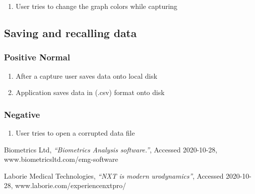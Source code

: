 \documentclass[12pt,a4paper]{article}
\begin{document}
\begin{enumerate}
	\item User tries to change the graph colors while capturing
\end{enumerate}

\subsection{Saving and recalling data}

\subsubsection{Positive Normal}

\begin{enumerate}
	\item After a capture user saves data onto local disk
	\item Application saves data in (.csv) format onto disk
\end{enumerate}

\subsubsection{Negative}

\begin{enumerate}
	\item User tries to open a corrupted data file  
\end{enumerate}

\newpage
\begin{thebibliography}{9}

  Biometrics Ltd,
  \textit{“Biometrics Analysis software.”},
  Accessed 2020-10-28,
  www.biometricsltd.com/emg-software
  
  Laborie Medical Technologies,
  \textit{“NXT is modern urodynamics”},
  Accessed 2020-10-28,
  www.laborie.com/experiencenxtpro/

\end{thebibliography}
\end{document}
